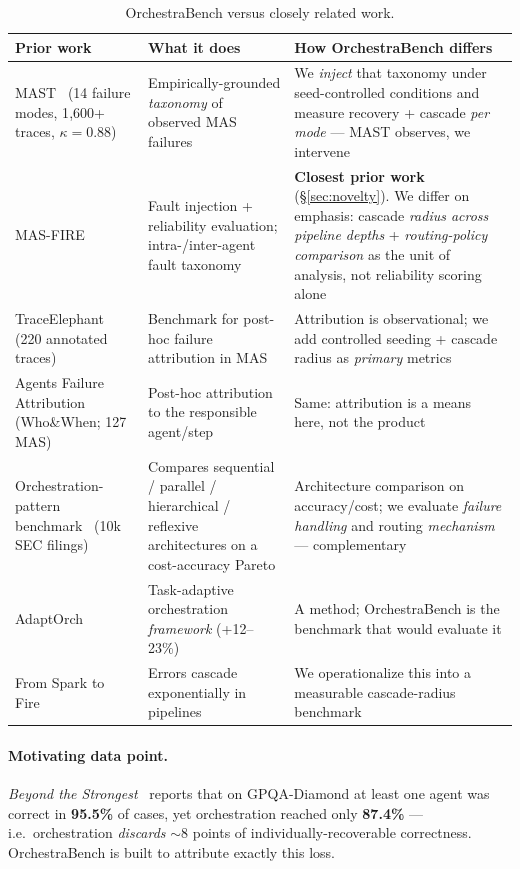 \documentclass[sigconf,nonacm,anonymous]{acmart}  %
\begin{document}
\begin{table}[t]
\centering
\caption{OrchestraBench versus closely related work.}
\label{tab:related}
\small
\begin{tabular}{@{}p{3.4cm}p{6.0cm}p{6.0cm}@{}}
\toprule
\textbf{Prior work} & \textbf{What it does} & \textbf{How OrchestraBench differs} \\
\midrule
MAST~\cite{mast} (14 failure modes, 1{,}600+ traces, $\kappa{=}0.88$) &
Empirically-grounded \emph{taxonomy} of observed MAS failures &
We \emph{inject} that taxonomy under seed-controlled conditions and measure
recovery + cascade \emph{per mode} --- MAST observes, we intervene \\
MAS-FIRE~\cite{masfire} &
Fault injection + reliability evaluation; intra-/inter-agent fault taxonomy &
\textbf{Closest prior work} (\S\ref{sec:novelty}). We differ on emphasis: cascade
\emph{radius across pipeline depths} + \emph{routing-policy comparison} as the
unit of analysis, not reliability scoring alone \\
TraceElephant~\cite{traceelephant} (220 annotated traces) &
Benchmark for post-hoc failure attribution in MAS &
Attribution is observational; we add controlled seeding + cascade radius as
\emph{primary} metrics \\
Agents Failure Attribution~\cite{attribution} (Who\&When; 127 MAS) &
Post-hoc attribution to the responsible agent/step &
Same: attribution is a means here, not the product \\
Orchestration-pattern benchmark~\cite{orchpattern} (10k SEC filings) &
Compares sequential / parallel / hierarchical / reflexive architectures on a
cost-accuracy Pareto &
Architecture comparison on accuracy/cost; we evaluate \emph{failure handling} and
routing \emph{mechanism} --- complementary \\
AdaptOrch~\cite{adaptorch} &
Task-adaptive orchestration \emph{framework} (+12--23\%) &
A method; OrchestraBench is the benchmark that would evaluate it \\
From Spark to Fire~\cite{sparkfire} &
Errors cascade exponentially in pipelines &
We operationalize this into a measurable cascade-radius benchmark \\
\bottomrule
\end{tabular}
\end{table}

\paragraph{Motivating data point.} \emph{Beyond the
Strongest}~\cite{beyondstrongest} reports that on GPQA-Diamond at least one agent
was correct in \textbf{95.5\%} of cases, yet orchestration reached only
\textbf{87.4\%} --- i.e.\ orchestration \emph{discards} $\sim$8 points of
individually-recoverable correctness. OrchestraBench is built to attribute
exactly this loss.
\end{document}
